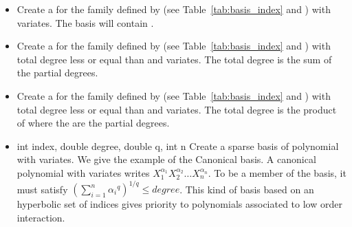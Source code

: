 \begin{itemize}
  \item {}
    \sshortdescribe Create a \PnlBasis for the family
    defined by  (see Table~\ref{tab:basis_index} and
    ) with 
    variates. The basis will contain .

  \item {}
    \sshortdescribe Create a \PnlBasis for the family
    defined by  (see Table~\ref{tab:basis_index} and ) with total degree less
    or equal than  and  variates. The total degree is the sum of the partial degrees.
  \item {}
    \sshortdescribe Create a \PnlBasis for the family
    defined by  (see Table~\ref{tab:basis_index} and ) with total degree less
    or equal than  and  variates. The total degree is
    the product of  where the  are the partial degrees.

  \item  {}
    {int index, double degree, double q, int n}
    \sshortdescribe Create a sparse basis of polynomial with 
    variates. We give the example of the Canonical basis. A canonical polynomial
    with  variates writes $X_1^{\alpha_1} X_2^{\alpha_2} \dots
    X_n^{\alpha_n}$. To be a member of the basis, it must satisfy $\left(\sum_{i=1}^n {\alpha_i}^q \right)^{1/q} \leq degree$. This kind of basis based on an hyperbolic set of indices gives priority to polynomials associated to low
    order interaction.


\end{itemize}
